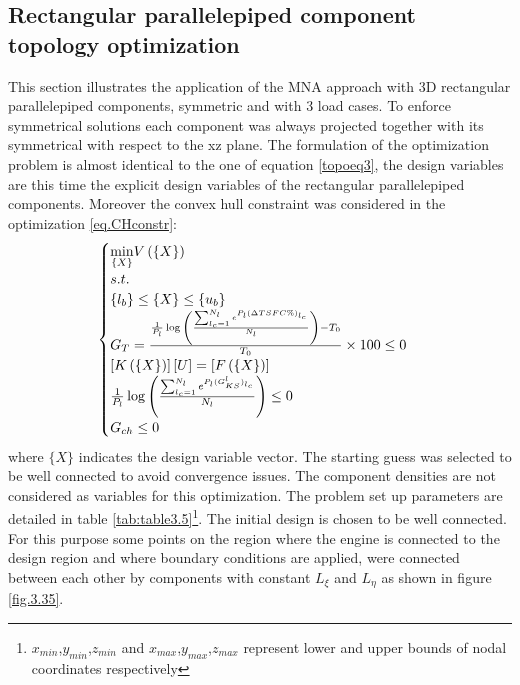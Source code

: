  \subsection{Rectangular parallelepiped component topology optimization}
  \label{ss3.10.3}
  This section illustrates the application of the MNA approach with 3D rectangular parallelepiped components, symmetric and with 3 load cases. 
  To enforce symmetrical solutions each component was always projected together with its symmetrical with respect to the xz plane. The formulation of the optimization problem is almost identical to the one of equation \ref{topoeq3}, the design variables are this time the explicit design variables of the rectangular parallelepiped components. Moreover the convex hull constraint was considered in the optimization \eqref{eq.CHconstr}:\\
   \begin{equation}
   \label{topoeq4}
   \begin{cases}
   \underset{\lbrace X\rbrace}{\min} V\left(\lbrace X\rbrace\right)& \\
   s.t. & \\ \left\lbrace{l_b}\right \rbrace\leq \left\lbrace{X}\right \rbrace \leq \left\lbrace{u_b}\right \rbrace  \\
   G_T=\frac{\frac{1}{P_l}\log{\left(\frac{\sum_{l_c=1}^{N_l}e^{P_l(\Delta TSFC \% )_{l_c}}}{N_l}\right)}-T_0}{T_0}\times 100 \leq 0 & \\
   \left[K\left(\lbrace X\rbrace\right)\right]\left[{U}\right] = \left[{ F \left(\lbrace X\rbrace\right)}\right]& \\
   \frac{1}{P_l}\log{\left(\frac{\sum_{l_c=1}^{N_l}e^{P_l(G^{l}_{KS})_{l_c}}}{N_l}\right)}\leq 0\\
   G_{ch}\leq 0
   \end{cases}
   \end{equation}
   where $\lbrace X\rbrace$ indicates the design variable vector.
    The starting guess was selected to be well connected to avoid convergence issues. The component densities are not considered as variables for this optimization. The problem set up parameters are detailed in table \ref{tab:table3.5}\footnote{$x_{min}$,$y_{min}$,$z_{min}$ and $x_{max}$,$y_{max}$,$z_{max}$ represent lower and upper bounds of nodal coordinates respectively}. The initial design is chosen to be well connected. For this purpose some points on the region where the engine is connected to the design region and where boundary conditions are applied, were connected between each other by components with constant $L_\xi$ and $L_\eta$ as shown in figure \ref{fig.3.35}.
